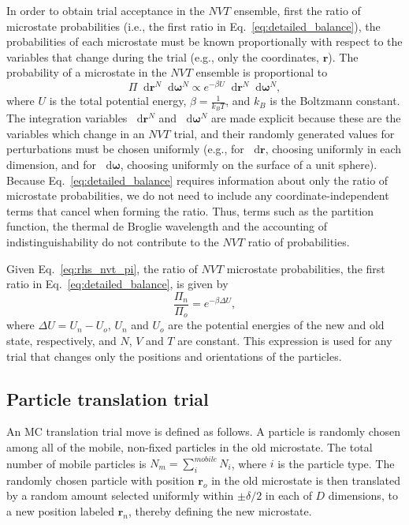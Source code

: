 \documentclass[
  9pt,
  bestpractices,
]{livecoms}
\newcommand*\diff{\mathop{}\!\mathrm{d}}
\begin{document}
In order to obtain trial acceptance in the $NVT$ ensemble, first the ratio of microstate probabilities (i.e., the first ratio in Eq.~\ref{eq:detailed_balance}), the probabilities of each microstate must be known proportionally with respect to the variables that change during the trial (e.g., only the coordinates, $\mathbf{r}$).
The probability of a microstate in the $NVT$ ensemble is proportional to \cite{allen_computer_1989, frenkel_understanding_2002}
\begin{equation}
\Pi \diff\mathbf{r}^N\diff\boldsymbol{\omega}^N \propto e^{-\beta U} \diff\mathbf{r}^N\diff\boldsymbol{\omega}^N,
\label{eq:rhs_nvt_pi}
\end{equation}
where $U$ is the total potential energy, $\beta=\frac{1}{k_B T}$, and $k_B$ is the Boltzmann constant.
The integration variables $\diff\mathbf{r}^{N}$ and $\diff\boldsymbol{\omega}^{N}$ are made explicit because these are the variables which change in an $NVT$ trial, and their randomly generated values for perturbations must be chosen uniformly (e.g., for $\diff\mathbf{r}$, choosing uniformly in each dimension, and for $\diff\boldsymbol{\omega}$, choosing uniformly on the surface of a unit sphere).
Because Eq.~\ref{eq:detailed_balance} requires information about only the ratio of microstate probabilities, we do not need to include any coordinate-independent terms that cancel when forming the ratio.
Thus, terms such as the partition function, the thermal de Broglie wavelength and the accounting of indistinguishability do not contribute to the $NVT$ ratio of probabilities.

Given Eq.~\ref{eq:rhs_nvt_pi}, the ratio of $NVT$ microstate probabilities, the first ratio in Eq.~\ref{eq:detailed_balance}, is given by
\begin{equation}
\frac{\Pi_n}{\Pi_o} = e^{-\beta\Delta U},
\label{eq:rhs_nvt}
\end{equation}
where $\Delta U = U_n - U_o$, $U_n$ and $U_o$ are the potential energies of the new and old state, respectively, and $N$, $V$ and $T$ are constant.
This expression is used for any trial that changes only the positions and orientations of the particles.

\subsection{\label{sec:lhs_translation}Particle translation trial}

An MC translation trial move is defined as follows.
A particle is randomly chosen among all of the mobile, non-fixed particles in the old microstate.
The total number of mobile particles is $N_m=\sum_i^{mobile} N_i$, where $i$ is the particle type.
The randomly chosen particle with position $\mathbf{r}_o$ in the old microstate is then translated by a random amount selected uniformly within $\pm\delta/2$ in each of $D$ dimensions, to a new position labeled $\mathbf{r}_n$, thereby defining the new microstate.
\end{document}
